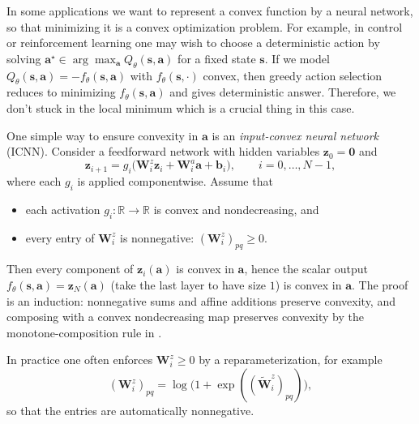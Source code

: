 \begin{example}
In some applications we want to represent a convex function by a neural network, so that minimizing it is a convex optimization problem.
For example, in control or reinforcement learning one may wish to choose a deterministic action by solving
$\mathbf{a}^\star\in\arg\max_{\mathbf{a}} Q_\theta(\mathbf{s},\mathbf{a})$ for a fixed state $\mathbf{s}$.
If we model $Q_\theta(\mathbf{s},\mathbf{a})=-f_\theta(\mathbf{s},\mathbf{a})$ with $f_\theta(\mathbf{s},\cdot)$ convex,
then greedy action selection reduces to minimizing $f_\theta(\mathbf{s},\mathbf{a})$ and gives deterministic answer.
Therefore, we don't stuck in the local minimum which is a crucial thing in this case.

One simple way to ensure convexity in $\mathbf{a}$ is an \emph{input-convex neural network} (ICNN).
Consider a feedforward network with hidden variables $\mathbf{z}_0=\mathbf{0}$ and
\[
  \mathbf{z}_{i+1}
  =g_i\bigl(\mathbf{W}_i^{z}\mathbf{z}_i+\mathbf{W}_i^{a}\mathbf{a}+\mathbf{b}_i\bigr),
  \qquad i=0,\ldots,N-1,
\]
where each $g_i$ is applied componentwise. Assume that
\begin{itemize}
  \item each activation $g_i:\mathbb{R}\to\mathbb{R}$ is convex and nondecreasing, and
  \item every entry of $\mathbf{W}_i^{z}$ is nonnegative: $(\mathbf{W}_i^{z})_{pq}\ge 0$.
\end{itemize}
Then every component of $\mathbf{z}_i(\mathbf{a})$ is convex in $\mathbf{a}$, hence the scalar output
$f_\theta(\mathbf{s},\mathbf{a})=\mathbf{z}_N(\mathbf{a})$ (take the last layer to have size $1$) is convex in $\mathbf{a}$.
The proof is an induction: nonnegative sums and affine additions preserve convexity, and composing with a convex nondecreasing map preserves
convexity by the monotone-composition rule in .

In practice one often enforces $\mathbf{W}_i^{z}\ge 0$ by a reparameterization, for example
\[
  (\mathbf{W}_i^{z})_{pq}=\log\bigl(1+\exp((\tilde{\mathbf{W}}_i^{z})_{pq})\bigr),
\]
so that the entries are automatically nonnegative.
\end{example}


